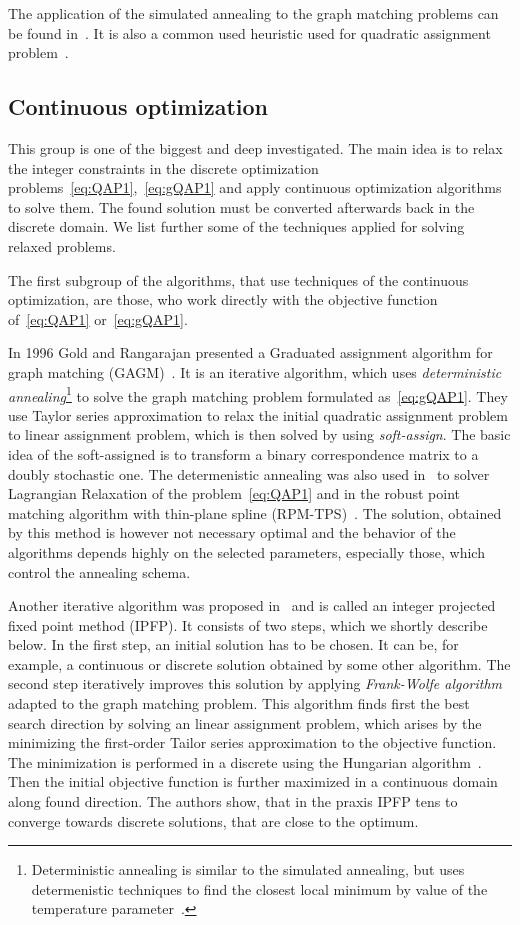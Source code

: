 The application of the simulated annealing to the graph matching problems can be found in~\cite{Herault1990_SimulatedAnnealing}. It is also a common used heuristic used for quadratic assignment problem~\cite{Burkard98thequadratic}.

\subsection{Continuous optimization}
This group is one of the biggest and deep investigated. The main idea is to relax the integer constraints in the discrete optimization problems~\eqref{eq:QAP1},~\eqref{eq:gQAP1} and apply continuous optimization algorithms to solve them. The found solution must be converted afterwards back in the discrete domain. We list further some of the techniques applied for solving relaxed problems.

The first subgroup of the algorithms, that use techniques of the continuous optimization, are those, who work directly with the objective function of~\eqref{eq:QAP1} or~\eqref{eq:gQAP1}.

In 1996 Gold and Rangarajan presented a Graduated assignment algorithm for graph matching (GAGM)~\cite{Rangarajan1996_GAGM}. It is an iterative algorithm, which uses \emph{deterministic annealing}\footnote{Deterministic annealing is similar to the simulated annealing, but uses determenistic techniques to find the closest local minimum by value of the temperature parameter~\cite{Rose1991_DA}.}  to solve the graph matching problem formulated as~\eqref{eq:gQAP1}. They use Taylor series approximation to relax the initial quadratic assignment problem to linear assignment problem, which is then solved by using \emph{soft-assign}. The basic idea of the soft-assigned is to transform a binary correspondence matrix to a doubly stochastic one. The determenistic annealing was also used in~\cite{Rangarajan96_LagRelax} to solver Lagrangian Relaxation of the problem~\eqref{eq:QAP1} and in the robust point matching algorithm with thin-plane spline (RPM-TPS)~\cite{Chui2003}. The solution, obtained by this method is however not necessary optimal and the behavior of the algorithms depends highly on the selected parameters, especially those, which control the annealing schema.

Another iterative algorithm was proposed in~\cite{Leordeanu2009_IPFP} and is called an integer projected fixed point method (IPFP). It consists of two steps, which we shortly describe below. In the first step, an initial solution has to be chosen. It can be, for example, a continuous or discrete solution obtained by some other algorithm. The second step iteratively improves this solution by applying \emph{Frank-Wolfe algorithm}~\cite{Wolfe1956} adapted to the graph matching problem. This algorithm finds first the best search direction by solving an linear assignment problem, which arises by the minimizing the first-order Tailor series approximation to the objective function. The minimization is performed in a discrete using the Hungarian algorithm~\cite{Kuhn1955}. Then the initial objective function is further maximized in a continuous domain along found direction. The authors show, that in the praxis IPFP tens to converge towards discrete solutions, that are close to the optimum.


